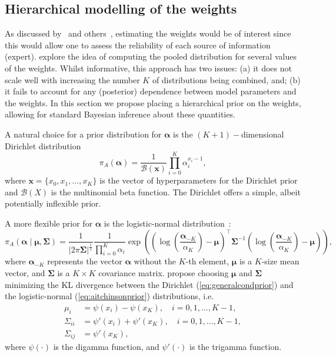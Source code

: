 \documentclass[a4paper, notitlepage, 11pt]{article}
\begin{document}
\subsection{Hierarchical modelling of the weights}
\label{sec:hierPrior}

As discussed by~\cite{Poole2000} and others~\citep{Zhong2015,Li2017}, estimating the weights would be of interest since this would allow one to assess the reliability of each source of information (expert).
\cite{Li2017} explore the idea of computing the pooled distribution for several values of the weights.
Whilst informative, this approach has two issues: (a) it does not scale well with increasing the number $K$ of distributions being combined, and; (b) it fails to account for any (posterior) dependence between model parameters and the weights.
In this section we propose placing a hierarchical prior on the weights, allowing for standard Bayesian inference about these quantities.

A natural choice for a prior distribution for $\boldsymbol\alpha$ is the $(K+1)-$dimensional Dirichlet distribution
\begin{equation}
 \label{eq:generalcondprior}
 \pi_A(\boldsymbol\alpha) = \frac{1}{\mathcal{B}(\boldsymbol x)}\prod_{i=0}^K \alpha_i^{x_i-1},
\end{equation}
where $\boldsymbol x = \{ x_0, x_1, \ldots, x_K\}$ is the vector of hyperparameters for the Dirichlet prior and $\mathcal{B}(X)$ is the multinomial beta function.
The Dirichlet offers a simple, albeit potentially inflexible prior.

A more flexible prior for $\boldsymbol\alpha$ is the logistic-normal distribution~\citep{Aitchson1980}:
\begin{equation}
 \label{eq:aitchinsonprior}
 \pi_A(\boldsymbol\alpha \mid \boldsymbol \mu, \boldsymbol \Sigma) = \frac{1}{|2\pi \boldsymbol \Sigma|^{\frac{1}{2}}}\frac{1}{\prod_{i=0}^K \alpha_i}
  \exp\left(
     \left(\log\left(\frac{\boldsymbol \alpha_{-K}}{\alpha_K}\right) - \boldsymbol \mu\right)^\top
     {\boldsymbol \Sigma}^{-1}
     \left(\log\left(\frac{\boldsymbol \alpha_{-K}}{\alpha_K}\right) - \boldsymbol \mu\right)
     \right),
\end{equation}
where $\boldsymbol \alpha_{-K}$ represents the vector $\boldsymbol \alpha$ without the $K$-th element, $\boldsymbol \mu$ is a $K$-size mean vector, and $\boldsymbol \Sigma$ is a $K \times K$ covariance matrix.
\citep{Aitchson1980} propose choosing $\boldsymbol \mu$ and $\boldsymbol \Sigma$ minimizing the KL divergence between the Dirichlet (\ref{eq:generalcondprior}) and the logistic-normal (\ref{eq:aitchinsonprior}) distributions, i.e.
\begin{align}
 \label{eq:momentmatching}
 \mu_i & = \psi(x_i) - \psi(x_K), \quad i=0,1,\ldots,K-1, \\
 \Sigma_{ii} & = \psi'(x_i) + \psi'(x_K), \quad i=0,1,\ldots,K-1, \\
 \Sigma_{ij} & = \psi'(x_K),
\end{align}
where $\psi(\cdot)$ is the digamma function, and $\psi'(\cdot)$ is the trigamma function.
\end{document}
